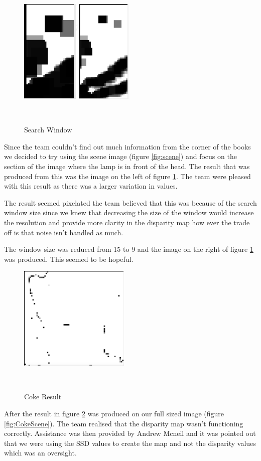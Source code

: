 \documentclass[twocolumn]{article}
\begin{document}
  
\begin{figure}[H]
\centering
  \includegraphics[height=50mm]{Figures/Search_Window_Comparison}
    \caption{Search Window}~\label{fig:Search_Window}
\end{figure} 
Since the team couldn't find out much information from the corner of the books we decided to try using the scene image (figure \ref{fig:scene}) and focus on the section of the image where the lamp is in front of the head. The result that was produced from this was the image on the left of figure \ref{fig:Search_Window}. The team were pleased with this result as there was a larger variation in values. 

The result seemed pixelated the team believed that this was because of the search window size since we knew that decreasing the size of the window would increase the resolution and provide more clarity in the disparity map how ever the trade off is that noise isn't handled as much. 

The window size was reduced from 15 to 9 and the image on the right of figure \ref{fig:Search_Window} was produced. This seemed to be hopeful.

\begin{figure}[H]
\centering
  \includegraphics[height=50mm]{Figures/Coke_Result}
    \caption{Coke Result}~\label{fig:Coke_Result}
\end{figure} 

After the result in figure \ref{fig:Coke_Result} was produced on our full sized image (figure \ref{fig:CokeScene}). The team realised that the disparity map wasn't functioning correctly. Assistance was then provided by Andrew Mcneil and it was pointed out that we were using the SSD values to create the map and not the disparity values which was an oversight.  
\end{document}
